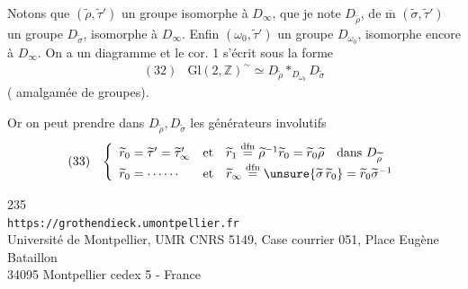 Notons que $(\widetilde\rho,\widetilde\tau')$  un groupe isomorphe à $D_\infty$, que je note $D_{\widetilde\rho}$,
de $\overline{\mathrm m}$ $(\widetilde\sigma,\widetilde\tau')$  un groupe $D_{\widetilde\sigma}$,
isomorphe à $D_\infty$. Enfin $(\omega_0,\widetilde\tau')$  un groupe $D_{\omega_0}$, isomorphe encore à $D_\infty$. On a un diagramme
et le cor. 1 s'écrit sous la forme
\[
\begin{array}{ll}
(32)&\mathrm{Gl}(2,\mathbb Z)^{\sim}\simeq D_{\widetilde\rho}*_{D_{\omega_0}}D_{\widetilde\sigma}
\end{array}
\]
( amalgamée de groupes).

Or on peut prendre dans $D_{\widetilde\rho},D_{\widetilde\sigma}$ les générateurs involutifs
\[
\begin{array}{ll}
(33)&\left\{\begin{array}{lll}
\widetilde r_0=\widetilde\tau'=\widetilde\tau'_\infty&\text{et}&
\widetilde r_1\overset{\mathrm{dfn}}{=}\widetilde\rho^{-1}\widetilde r_0=\widetilde r_0\widetilde\rho\quad\text{dans }D_{\widetilde\rho}\\
\widetilde r_0=\cdots\cdots&\text{et}&
\widetilde r_\infty\overset{\mathrm{dfn}}{=}\unsure{\widetilde\sigma\,\widetilde r_0}=\widetilde r_0\widetilde\sigma^{-1}
\end{array}\right.
\end{array}
\]


\begin{center}
235\\
\texttt{https://grothendieck.umontpellier.fr}\\
Université de Montpellier, UMR CNRS 5149, Case courrier 051, Place Eugène Bataillon\\
34095 Montpellier cedex 5 - France
\end{center}

